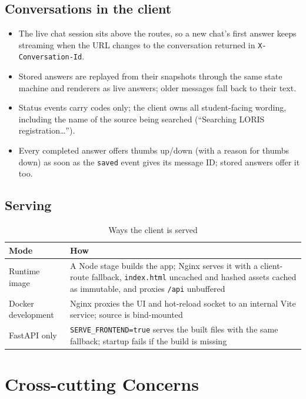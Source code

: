 \documentclass[11pt,letterpaper]{report}
\begin{document}
\section{Conversations in the client}
\begin{itemize}
  \item The live chat session sits above the routes, so a new chat's first answer keeps streaming
        when the URL changes to the conversation returned in \texttt{X-Conversation-Id}.
  \item Stored answers are replayed from their snapshots through the same state machine and
        renderers as live answers; older messages fall back to their text.
  \item Status events carry codes only; the client owns all student-facing wording, including the
        name of the source being searched (``Searching LORIS registration\ldots'').
  \item Every completed answer offers thumbs up/down (with a reason for thumbs down) as soon as the
        \texttt{saved} event gives its message ID; stored answers offer it too.
\end{itemize}

\section{Serving}
\begin{table}[H]
\centering
\caption{Ways the client is served}\label{tab:clientserve}
\begin{tabularx}{\textwidth}{@{}P{3.6cm}L@{}}
\toprule
\textbf{Mode} & \textbf{How} \\
\midrule
Runtime image & A Node stage builds the app; Nginx serves it with a client-route fallback, \texttt{index.html} uncached and hashed assets cached as immutable, and proxies \texttt{/api} unbuffered \\
Docker development & Nginx proxies the UI and hot-reload socket to an internal Vite service; source is bind-mounted \\
FastAPI only & \texttt{SERVE\_FRONTEND=true} serves the built files with the same fallback; startup fails if the build is missing \\
\bottomrule
\end{tabularx}
\end{table}

\chapter{Cross-cutting Concerns}\label{ch:cross}
\end{document}

